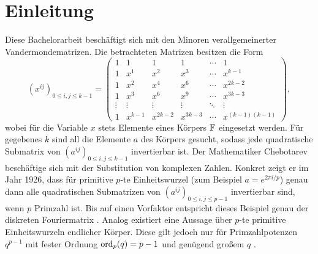 \section{Einleitung}


Diese Bachelorarbeit beschäftigt sich mit den Minoren verallgemeinerter Vandermondematrizen. Die betrachteten Matrizen besitzen die Form \begin{equation*}
    \left( x^{ij} \right)_{0\leq i,j \leq k-1} = \begin{pmatrix}
        1     & 1    & 1    & 1    &\cdots& 1 \\
        1     & x^1  & x^2  & x^3  &\cdots& x^{k-1} \\
        1     & x^2  & x^4  & x^6  &\cdots& x^{2k-2} \\
        1     & x^3  & x^6  & x^9  &\cdots& x^{3k-3} \\
        \vdots&\vdots&\vdots&\vdots&\ddots&\vdots \\
        1     &x^{k-1}&x^{2k-2}&x^{3k-3}&\cdots&x^{(k-1)(k-1)}
    \end{pmatrix},
\end{equation*}
wobei für die Variable $x$ stets Elemente eines Körpers $\field{}$ eingesetzt werden. Für gegebenes $k$ sind all die Elemente $a$ des Körpers gesucht, sodass jede quadratische Submatrix von $\left( a^{ij} \right)_{0\leq i,j \leq k-1}$ invertierbar ist. Der Mathematiker Chebotarev beschäftige sich mit der Substitution von komplexen Zahlen. Konkret zeigt er im Jahr 1926, dass für primitive $p$-te Einheitswurzel (zum Beispiel $a=e^{2\pi i/p}$) genau dann alle quadratischen Submatrizen von $\left( a^{ij} \right)_{0\leq i,j \leq p-1}$ invertierbar sind, wenn $p$ Primzahl ist. Bis auf einen Vorfaktor entspricht dieses Beispiel genau der diskreten Fouriermatrix \cite{CheboProof}. Analog existiert eine Aussage über $p$-te primitive Einheitswurzeln endlicher Körper. Diese gilt jedoch nur für Primzahlpotenzen $q^{p-1}$ mit fester Ordnung $\ord{q}[p] = p-1$ und genügend großem $q$ \cite{CheboFiniteFields}.

